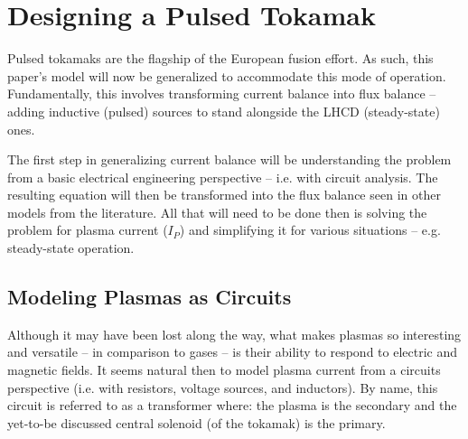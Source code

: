%
%
%
%
%
%
%
%

\chapter{Designing a Pulsed Tokamak}

Pulsed tokamaks are the flagship of the European fusion  effort. As such, this paper's model will now be generalized to accommodate this mode of operation. Fundamentally, this involves transforming current balance into flux balance -- adding inductive (pulsed) sources to stand alongside the LHCD (steady-state) ones.

The first step in generalizing current balance will be understanding the problem from a basic electrical engineering perspective -- i.e. with circuit analysis. The resulting equation will then be transformed into the flux balance seen in other models from the literature. All that will need to be done then is solving the problem for plasma current ($I_P$) and simplifying it for various situations -- e.g. steady-state operation.


\section{Modeling Plasmas as Circuits}

Although it may have been lost along the way, what makes plasmas so interesting and versatile -- in comparison to gases -- is their ability to respond to electric and magnetic fields. It seems natural then to model plasma current from a circuits perspective (i.e. with resistors, voltage sources, and inductors). By name, this circuit is referred to as a transformer where: the plasma is the secondary and the yet-to-be discussed central solenoid (of the tokamak) is the primary.

